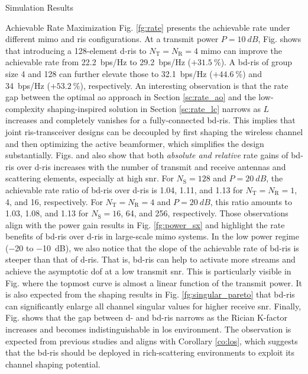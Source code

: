 \documentclass[journal]{IEEEtran}
\begin{document}
\begin{section}{Simulation Results}
\begin{subsection}{Achievable Rate Maximization}
		Fig. \ref{fg:rate} presents the achievable rate under different \gls{mimo} and \gls{ris} configurations.
		At a transmit power $P = \qty{10}{dB}$, Fig.  shows that introducing a 128-element \gls{d}-\gls{ris} to $N_\mathrm{T}=N_\mathrm{R}=4$ \gls{mimo} can improve the achievable rate from \qty{22.2}{bps/Hz} to \qty{29.2}{bps/Hz} ($+\qty{31.5}{\percent}$).
		A \gls{bd}-\gls{ris} of group size 4 and 128 can further elevate those to \qty{32.1}{bps/Hz} ($+\qty{44.6}{\percent}$) and \qty{34}{bps/Hz}  ($+\qty{53.2}{\percent}$), respectively.
		An interesting observation is that the rate gap between the optimal \gls{ao} approach in Section \ref{sc:rate_ao} and the low-complexity shaping-inspired solution in Section \ref{sc:rate_lc} narrows as $L$ increases and completely vanishes for a fully-connected \gls{bd}-\gls{ris}.
		This implies that joint \gls{ris}-transceiver designs can be decoupled by first shaping the wireless channel and then optimizing the active beamformer, which simplifies the design substantially.
		Figs.  and  also show that both \emph{absolute and relative} rate gains of \gls{bd}-\gls{ris} over \gls{d}-\gls{ris}
		increases with the number of transmit and receive antennas and scattering elements, especially at high \gls{snr}.
		For $N_\mathrm{S}=128$ and $P = \qty{20}{dB}$,
		the achievable rate ratio of \gls{bd}-\gls{ris} over \gls{d}-\gls{ris} is \num{1.04}, \num{1.11}, and \num{1.13} for $N_\mathrm{T}=N_\mathrm{R}=1$, \num{4}, and \num{16}, respectively.
		For $N_\mathrm{T}=N_\mathrm{R}=4$ and $P = \qty{20}{dB}$, this ratio amounts to \num{1.03}, \num{1.08}, and \num{1.13} for $N_\mathrm{S}=16$, \num{64}, and \num{256}, respectively.
		Those observations align with the power gain results in Fig. \ref{fg:power_sx} and highlight the rate benefits of \gls{bd}-\gls{ris} over \gls{d}-\gls{ris} in large-scale \gls{mimo} systems.
		In the low power regime (\num{-20} to \qty{-10}{dB}), we also notice that the slope of the achievable rate of \gls{bd}-\gls{ris} is steeper than that of \gls{d}-\gls{ris}.
		That is, \gls{bd}-\gls{ris} can help to activate more streams and achieve the asymptotic \gls{dof} at a low transmit \gls{snr}.
		This is particularly visible in Fig.  where the topmost curve is almost a linear function of the transmit power.
		It is also expected from the shaping results in Fig. \ref{fg:singular_pareto} that \gls{bd}-\gls{ris} can significantly enlarge all channel singular values for higher receive \gls{snr}.
		Finally, Fig.  shows that the gap between \gls{d}- and \gls{bd}-\gls{ris} narrows as the Rician K-factor increases and becomes indistinguishable in \gls{los} environment.
		The observation is expected from previous studies \cite{Shen2020a,Li2023b,Nerini2023} and aligns with Corollary \ref{co:los}, which suggests that the \gls{bd}-\gls{ris} should be deployed in rich-scattering environments to exploit its channel shaping potential.


\end{subsection}
\end{section}
\end{document}
